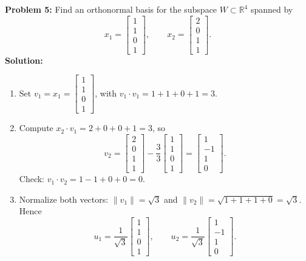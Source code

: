 \documentclass[11pt, letterpaper]{article}
\theoremstyle{definition}
\theoremstyle{remark}
\begin{document}
\textbf{Problem 5:} Find an orthonormal basis for the subspace $W \subset \mathbb{R}^4$ spanned by
\[
    x_1 = \begin{bmatrix} 1 \\ 1 \\ 0 \\ 1 \end{bmatrix}, \qquad x_2 = \begin{bmatrix} 2 \\ 0 \\ 1 \\ 1 \end{bmatrix}.
\]
\textbf{Solution:}
\begin{enumerate}[label=\textbf{Step \arabic*:}]
    \item Set $v_1 = x_1 = \begin{bmatrix} 1 \\ 1 \\ 0 \\ 1 \end{bmatrix}$, with $v_1 \cdot v_1 = 1 + 1 + 0 + 1 = 3$.
    \item Compute $x_2 \cdot v_1 = 2 + 0 + 0 + 1 = 3$, so
    \[
        v_2 = \begin{bmatrix} 2 \\ 0 \\ 1 \\ 1 \end{bmatrix} - \frac{3}{3}\begin{bmatrix} 1 \\ 1 \\ 0 \\ 1 \end{bmatrix} = \begin{bmatrix} 1 \\ -1 \\ 1 \\ 0 \end{bmatrix}.
    \]
    Check: $v_1 \cdot v_2 = 1 - 1 + 0 + 0 = 0$.
    \item Normalize both vectors: $\|v_1\| = \sqrt{3}$ and $\|v_2\| = \sqrt{1 + 1 + 1 + 0} = \sqrt{3}$. Hence
    \[
        u_1 = \frac{1}{\sqrt{3}}\begin{bmatrix} 1 \\ 1 \\ 0 \\ 1 \end{bmatrix}, \qquad u_2 = \frac{1}{\sqrt{3}}\begin{bmatrix} 1 \\ -1 \\ 1 \\ 0 \end{bmatrix}.
    \]
\end{enumerate}
\end{document}
